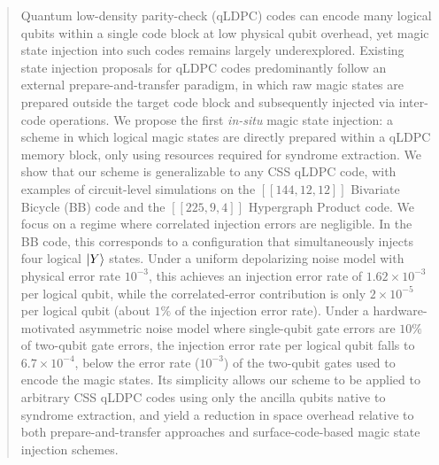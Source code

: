 \begin{abstract}

Quantum low-density parity-check (qLDPC) codes can encode many logical qubits within a single code block at low physical qubit overhead, yet magic state injection into such codes remains largely underexplored. Existing state injection proposals for qLDPC codes predominantly follow an external prepare-and-transfer paradigm, in which raw magic states are prepared outside the target code block and subsequently injected via inter-code operations. 
We propose the first \emph{in-situ} magic state injection: a scheme in which logical magic states are directly prepared within a qLDPC memory block, only using resources required for syndrome extraction.
We show that our scheme is generalizable to any CSS qLDPC code,
with examples of circuit-level simulations on the $[[144,12,12]]$ Bivariate Bicycle (BB) code and the $[[225,9,4]]$ Hypergraph Product code. 
We focus on a regime where correlated injection errors are negligible.
In the BB code, this corresponds to a configuration that simultaneously injects four logical $\ket{Y}$ states.
Under a uniform depolarizing noise model with physical error rate $10^{-3}$, this achieves an injection error rate of $1.62 \times 10^{-3}$ per logical qubit, while the correlated-error contribution is only $2 \times 10^{-5}$ per logical qubit (about $1\%$ of the injection error rate).
Under a hardware-motivated asymmetric noise model where single-qubit gate errors are $10\%$ of two-qubit gate errors,
the injection error rate per logical qubit falls to $ 6.7 \times 10^{-4} $, below the error rate ($ 10^{-3} $) of the two-qubit gates used to encode the magic states.
Its simplicity allows our scheme to be applied to arbitrary CSS qLDPC codes using only the ancilla qubits native to syndrome extraction, and yield a reduction in space overhead relative to both prepare-and-transfer approaches and surface-code-based magic state injection schemes.
\end{abstract}
